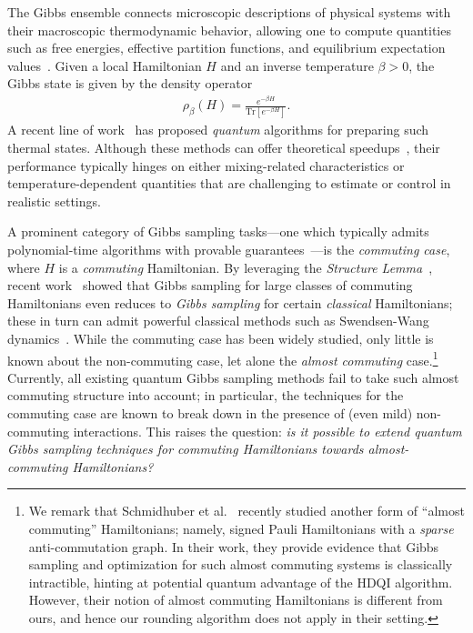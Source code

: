 \documentclass[11pt]{article}
\theoremstyle{plain}
\begin{document}
The Gibbs ensemble connects microscopic descriptions of physical systems with their macroscopic thermodynamic behavior, allowing one to compute quantities such as free energies, effective partition functions, and equilibrium expectation values~\cite{PathriaBeale2011,Chandler1987,Callen1985,LandauLifshitz1980,Sachdev2011,AltlandSimons2010,Mermin1965,Tuckerman2010,LandauBinder2014}. Given a local Hamiltonian $H$ and an inverse temperature $\beta > 0$, the Gibbs state is given by the density operator
\begin{align}\label{eq:gibbs-ex}
\rho_\beta(H) = \frac{e^{-\beta H}}{\mathrm{Tr}\left[e^{-\beta 
H}\right]}.
\end{align}
A recent line of work~\cite{Temme_2011,GilyenThermal23a,chen2023efficient,BCL24,rajakumar2024gibbs} has proposed \textit{quantum} algorithms for preparing such thermal states. Although these methods can offer theoretical speedups~\cite{BCL24,rajakumar2024gibbs}, their performance typically hinges on either mixing-related characteristics or temperature-dependent quantities that are challenging to estimate or control in realistic settings.

A prominent category of Gibbs sampling tasks---one which typically admits polynomial-time algorithms with provable guarantees~\cite{hwang2025gibbsstatepreparationcommuting,schmidhuber2025hamiltoniandecodedquantuminterferometry}---is the \emph{commuting case}, where $H$ is a \emph{commuting} Hamiltonian.
By leveraging the \emph{Structure 
Lemma}~\cite{bravyi2004commutativeversionklocalhamiltonian}, recent 
work~\cite{hwang2025gibbsstatepreparationcommuting} showed that Gibbs 
sampling for large classes of commuting Hamiltonians even reduces to 
\emph{Gibbs sampling} for certain \emph{classical} Hamiltonians; these 
in turn can admit powerful classical methods such as Swendsen-Wang 
dynamics~\cite{PhysRevLett.58.86,feng2022swendsenwangdynamicsferromagneticising}. While the commuting case has been widely studied, only little is known about the non-commuting case, let alone the \emph{almost commuting} case.\footnote{
We remark that Schmidhuber et 
al.~\cite{schmidhuber2025hamiltoniandecodedquantuminterferometry} 
recently studied another form of ``almost commuting'' Hamiltonians;
namely, signed Pauli Hamiltonians with a \emph{sparse} anti-commutation 
graph. In their work, they provide evidence that Gibbs sampling and 
optimization for such almost commuting 
systems is classically intractible, hinting at potential quantum 
advantage of the HDQI algorithm.
However, their notion of almost commuting Hamiltonians is different from 
ours, and hence our rounding algorithm does not apply in their setting.
}
Currently, all existing quantum Gibbs sampling methods fail to take 
such almost commuting structure into account; in particular, the 
techniques for the commuting case are known to break down in the presence of (even mild) non-commuting interactions. This raises the question: \emph{is it possible to extend quantum Gibbs sampling techniques for commuting Hamiltonians towards almost-commuting Hamiltonians?}
\end{document}
